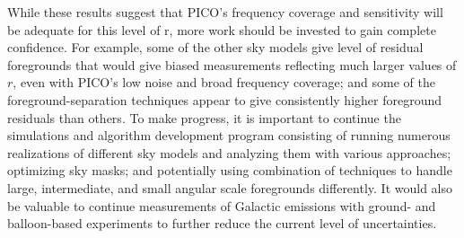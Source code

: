\documentclass[PICOReport.tex]{subfiles}
\begin{document}
While these results suggest that PICO's frequency coverage and sensitivity will be adequate for this level of r,  more work should be invested to gain complete confidence. For example, some of the other sky models give level of residual foregrounds that would give biased measurements reflecting much larger values of $r$, even with PICO's low noise and broad frequency coverage; and some of the foreground-separation techniques appear to give consistently higher foreground residuals than others. To make progress, it is important to continue the simulations and algorithm development program consisting of  running numerous realizations of different sky models and analyzing them with various approaches; optimizing sky masks; and potentially using combination of techniques to handle large, intermediate, and small angular scale foregrounds differently. It would also be valuable to continue measurements of Galactic emissions with ground- and balloon-based experiments to further reduce the current level of uncertainties. 
\end{document}
